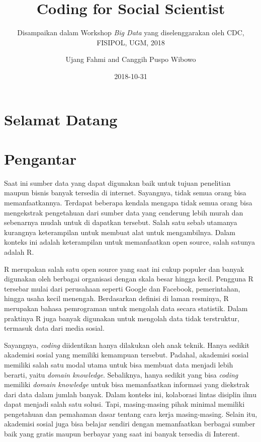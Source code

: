 \documentclass[]{book}
\title{Coding for Social Scientist}
\subtitle{Disampaikan dalam Workshop \emph{Big Data} yang diselenggarakan oleh
CDC, FISIPOL, UGM, 2018}
\author{Ujang Fahmi and Canggih Puspo Wibowo}
\date{2018-10-31}
\begin{document}
\maketitle

{
\hypersetup{linkcolor=black}
\setcounter{tocdepth}{1}
\tableofcontents
}
\hypertarget{selamat-datang}{%
\chapter*{Selamat Datang}\label{selamat-datang}}

\hypertarget{pengantar}{%
\chapter*{Pengantar}\label{pengantar}}

Saat ini sumber data yang dapat digunakan baik untuk tujuan penelitian
maupun bisnis banyak tersedia di internet. Sayangnya, tidak semua orang
bisa memanfaatkannya. Terdapat beberapa kendala mengapa tidak semua
orang bisa mengekstrak pengetahuan dari sumber data yang cenderung lebih
murah dan sebenarnya mudah untuk di dapatkan tersebut. Salah satu sebab
utamanya kurangnya keterampilan untuk membuat alat untuk mengambilnya.
Dalam konteks ini adalah keterampilan untuk memanfaatkan open source,
salah satunya adalah R.

R merupakan salah satu open source yang saat ini cukup populer dan
banyak digunakan oleh berbagai organisasi dengan skala besar hingga
kecil. Pengguna R tersebar mulai dari perusahaan seperti Google dan
Facebook, pemerintahan, hingga usaha kecil menengah. Berdasarkan
definisi di laman resminya, R merupakan bahasa pemrograman untuk
mengolah data secara statistik. Dalam praktinya R juga banyak digunakan
untuk mengolah data tidak terstruktur, termasuk data dari media sosial.

Sayangnya, \emph{coding} diidentikan hanya dilakukan oleh anak teknik.
Hanya sedikit akademisi sosial yang memiliki kemampuan tersebut.
Padahal, akademisi sosial memiliki salah satu modal utama untuk bisa
membuat data menjadi lebih berarti, yaitu \emph{domain knowledge}.
Sebaliknya, hanya sedikit yang bisa \emph{coding} memiliki \emph{domain
knowledge} untuk bisa memanfaatkan informasi yang diekstrak dari data
dalam jumlah banyak. Dalam konteks ini, kolaborasi lintas disiplin ilmu
dapat menjadi salah satu solusi. Tapi, masing-masing pihak minimal
memiliki pengetahuan dan pemahaman dasar tentang cara kerja
masing-masing. Selain itu, akademisi sosial juga bisa belajar sendiri
dengan memanfaatkan berbagai sumber baik yang gratis maupun berbayar
yang saat ini banyak tersedia di Interent.
\end{document}
